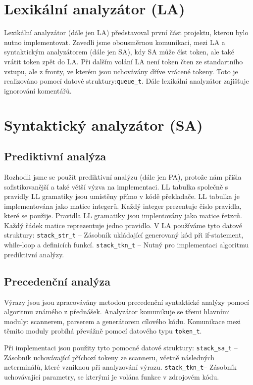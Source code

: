 \documentclass[11pt, a4paper]{article}
\begin{document}
\section{Lexikální analyzátor (LA)}
Lexikální analyzátor (dále jen LA) představoval první část projektu, kterou bylo nutno implementovat. Zavedli jsme obousměrnou komunikaci, mezi LA a syntaktickým analyzátorem (dále jen SA), kdy SA může číst token, ale také vrátit token zpět do LA. Při dalším volání LA není token čten ze standartního vstupu, ale z fronty, ve kterém jsou uchovávány dříve vrácené tokeny. Toto je realizováno pomocí datové struktury:\verb|queue_t|. 
Dále lexikální analyzátor zajišťuje ignorování komentářů. 

\section{Syntaktický analyzátor (SA)}
\subsection{Prediktivní analýza}
Rozhodli jsme se použít prediktivní analýzu (dále jen PA), protože nám přišla sofistikovanější a také větší výzva na implementaci. LL tabulka společně s pravidly LL gramatiky jsou umístěny přímo v kódě překladače. LL tabulka je implementována jako matice integerů. Každý integer prezentuje číslo pravidla, které se použije. Pravidla LL gramatiky jsou implentovány jako matice řetzců. Každý řádek matice reprezentuje jedno pravidlo. V LA používáme tyto datové struktury:\newline
\verb|stack_str_t| -- Zásobník ukládající generovaný kód při if-statement, while-loop a definicích funkcí.\newline
\verb|stack_tkn_t| -- Nutný pro implementaci algoritmu prediktivní analýzy. \newline

\subsection{Precedenční analýza}
Výrazy jsou jsou zpracovávány metodou precedenční syntaktické analýzy pomocí algoritmu známého z přednášek. Analyzátor komunikuje se třemi hlavními moduly: scannerem, parserem a generátorem cílového kódu. Komunikace mezi těmito moduly probíhá převážně pomocí datového typu \verb|token_t|.

Při implementaci jsou použity tyto pomocné datové struktury: \newline
       \verb|stack_sa_t| -- Zásobník uchovávající příchozí tokeny ze scanneru, včetně následných neterminálů, které vzniknou při analyzování výrazu. \newline
       \verb|stack_tkn_t|-- Zásobník uchovávající parametry, se kterými je volána funkce v zdrojovém kódu.\newline
\end{document}
